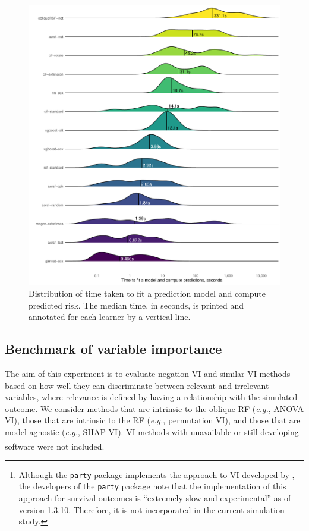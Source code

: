 \documentclass{article}\usepackage[]{graphicx}\usepackage[]{xcolor}
\makeatletter
\def\maxwidth{ %
  \ifdim\Gin@nat@width>\linewidth
    \linewidth
  \else
    \Gin@nat@width
  \fi
}
\newenvironment{knitrout}{}{} %
\newcommand{\eg}{\textit{e.g.}}
\makeatother
\begin{document}
\begin{knitrout}
\color{fgcolor}\begin{figure}
\includegraphics[width=\maxwidth]{figure/bm_pred_time-1} \caption[Distribution of time taken to fit a prediction model and compute predicted risk]{Distribution of time taken to fit a prediction model and compute predicted risk. The median time, in seconds, is printed and annotated for each learner by a vertical line.}\label{fig:bm_pred_time}
\end{figure}

\end{knitrout}


\subsection{Benchmark of variable importance} \label{sec:bm_vi}

The aim of this experiment is to evaluate negation VI and similar VI methods based on how well they can discriminate between relevant and irrelevant variables, where relevance is defined by having a relationship with the simulated outcome. We consider methods that are intrinsic to the oblique RF (\eg, ANOVA VI), those that are intrinsic to the RF (\eg, permutation VI), and those that are model-agnostic (\eg, SHAP VI). VI methods with unavailable or still developing software were not included.\footnote{Although the \texttt{party} package implements the approach to VI developed by \citet{strobl2007bias}, the developers of the \texttt{party} package note that the implementation of this approach for survival outcomes is ``extremely slow and experimental'' as of version 1.3.10. Therefore, it is not incorporated in the current simulation study.}
\end{document}
